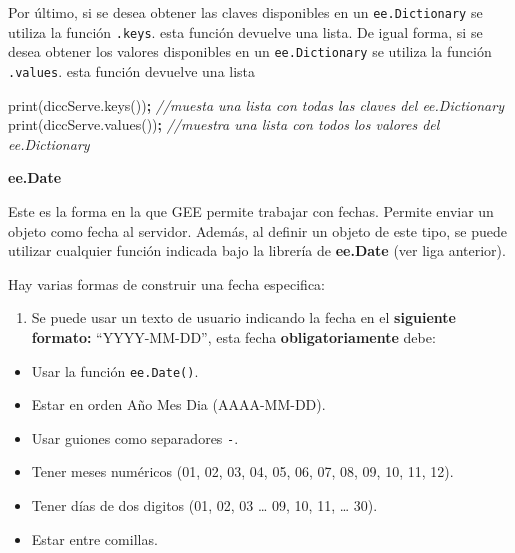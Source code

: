 \documentclass[
]{article}
\newenvironment{Shaded}{\begin{snugshade}}{\end{snugshade}}
\newcommand{\AttributeTok}[1]{\textcolor[rgb]{0.77,0.63,0.00}{#1}}
\newcommand{\CommentTok}[1]{\textcolor[rgb]{0.56,0.35,0.01}{\textit{#1}}}
\newcommand{\NormalTok}[1]{#1}
\newcommand{\OperatorTok}[1]{\textcolor[rgb]{0.81,0.36,0.00}{\textbf{#1}}}
\newcommand{\VariableTok}[1]{\textcolor[rgb]{0.00,0.00,0.00}{#1}}
\providecommand{\tightlist}{%
  \setlength{\itemsep}{0pt}\setlength{\parskip}{0pt}}
\begin{document}
Por último, si se desea obtener las claves disponibles en un
\texttt{ee.Dictionary} se utiliza la función \texttt{.keys}. esta
función devuelve una lista. De igual forma, si se desea obtener los
valores disponibles en un \texttt{ee.Dictionary} se utiliza la función
\texttt{.values}. esta función devuelve una lista

\begin{Shaded}
\begin{Highlighting}[]
\AttributeTok{print}\NormalTok{(}\VariableTok{diccServe}\NormalTok{.}\AttributeTok{keys}\NormalTok{())}\OperatorTok{;}    \CommentTok{//muesta una lista con todas las claves del ee.Dictionary}
\AttributeTok{print}\NormalTok{(}\VariableTok{diccServe}\NormalTok{.}\AttributeTok{values}\NormalTok{())}\OperatorTok{;}  \CommentTok{//muestra una lista con todos los valores del ee.Dictionary}
\end{Highlighting}
\end{Shaded}

\textbf{ee.Date}

Este es la forma en la que GEE permite trabajar con fechas. Permite
enviar un objeto como fecha al servidor. Además, al definir un objeto de
este tipo, se puede utilizar cualquier función indicada bajo la librería
de \textbf{ee.Date} (ver liga anterior).

Hay varias formas de construir una fecha especifica:

\begin{enumerate}
\def\labelenumi{\arabic{enumi}.}
\tightlist
\item
  Se puede usar un texto de usuario indicando la fecha en el
  \textbf{siguiente formato:} ``YYYY-MM-DD'', esta fecha
  \textbf{obligatoriamente} debe:
\end{enumerate}

\begin{itemize}
\tightlist
\item
  Usar la función \texttt{ee.Date()}.
\item
  Estar en orden Año Mes Dia (AAAA-MM-DD).
\item
  Usar guiones como separadores \texttt{-}.
\item
  Tener meses numéricos (01, 02, 03, 04, 05, 06, 07, 08, 09, 10, 11,
  12).
\item
  Tener días de dos digitos (01, 02, 03 \ldots{} 09, 10, 11, \ldots{}
  30).
\item
  Estar entre comillas.
\end{itemize}
\end{document}

